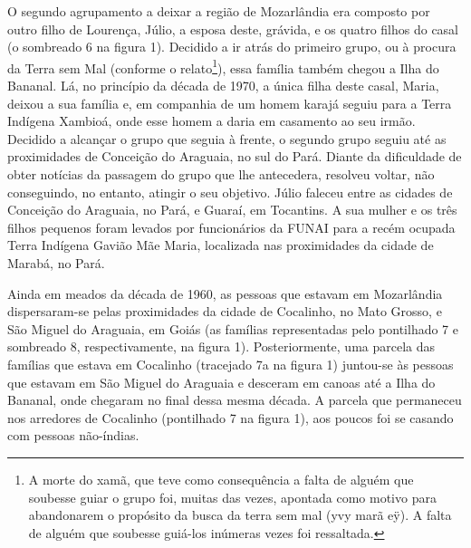 O segundo agrupamento a deixar a região de Mozarlândia era composto por
outro filho de Lourença, Júlio, a esposa deste, grávida, e os quatro
filhos do casal (o sombreado 6 na figura 1). Decidido a ir atrás do
primeiro grupo, ou à procura da Terra sem Mal (conforme o
relato\footnote{A morte do xamã, que teve como consequência a falta de
alguém que soubesse guiar o grupo foi, muitas das vezes, apontada como
motivo para abandonarem o propósito da busca da terra sem mal (yvy marã
eÿ). A falta de alguém que soubesse guiá-los inúmeras vezes foi
ressaltada.}), essa família também chegou a Ilha do Bananal. Lá, no
princípio da década de 1970, a única filha deste casal, Maria, deixou a
sua família e, em companhia de um homem karajá seguiu para a Terra
Indígena Xambioá, onde esse homem a daria em casamento ao seu irmão.
Decidido a alcançar o grupo que seguia à frente, o segundo grupo seguiu
até as proximidades de Conceição do Araguaia, no sul do Pará. Diante da
dificuldade de obter notícias da passagem do grupo que lhe antecedera,
resolveu voltar, não conseguindo, no entanto, atingir o seu objetivo.
Júlio faleceu entre as cidades de Conceição do Araguaia, no Pará, e
Guaraí, em Tocantins. A sua mulher e os três filhos pequenos foram
levados por funcionários da FUNAI para a recém ocupada Terra Indígena
Gavião Mãe Maria, localizada nas proximidades da cidade de Marabá, no
Pará. 

Ainda em meados da década de 1960, as pessoas que estavam em Mozarlândia
dispersaram-se pelas proximidades da cidade de Cocalinho, no Mato
Grosso, e São Miguel do Araguaia, em Goiás (as famílias representadas
pelo pontilhado 7 e sombreado 8, respectivamente, na figura 1).
Posteriormente, uma parcela das famílias que estava em Cocalinho
(tracejado 7a na figura 1) juntou-se às pessoas que estavam em São
Miguel do Araguaia e desceram em canoas até a Ilha do Bananal, onde
chegaram no final dessa mesma década. A parcela que permaneceu nos
arredores de Cocalinho (pontilhado 7 na figura 1), aos poucos foi se
casando com pessoas não-índias.  



